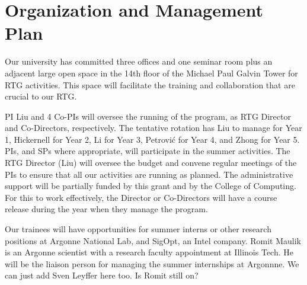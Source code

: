 \documentclass[11pt]{NSFamsart}
\begin{document}
\section{Organization and Management Plan }
 
 \iffalse
 Provide evidence of past success in training undergraduates, graduate students, and postdocs, identifying names, degree dates, and subsequent placement (including the flow of undergraduates into graduate programs). Applicants may refer to Trainee Data in supplemental documents, if included. Describe the plans, procedures, and personnel for the development and monitoring of all aspects of the project. In particular, discuss plans to ensure appropriate mentoring of students and postdoctoral associates, as well as the roles of the faculty involved. Provide evidence of faculty commitment necessary for the implementation of the proposed program. If the project involves international collaborations, industrial internships, or arrangements with government laboratories, businesses, or other departments, then the proposal should document existing arrangements, any plans for expanding these arrangements, and the personnel involved in managing these linkages.  
 \fi
 
Our university has committed three offices and one seminar room plus an adjacent large open space in the 14th floor of the Michael Paul Galvin Tower for RTG activities. This space will facilitate the training and collaboration that are crucial to our RTG.
 
PI Liu and 4 Co-PIs will oversee the running of the program, as RTG Director  and Co-Directors, respectively.  The tentative rotation has Liu to manage for Year 1, Hickernell for Year 2,    Li for  Year 3, Petrovi\'{c} for Year 4,     and Zhong for Year 5.    PIs, and SPs where appropriate, will participate in the summer activities.
The RTG Director (Liu) will oversee the budget and convene regular meetings of the PIs to ensure that all our activities are running as planned. %
The administrative support will be partially funded by this grant and by the College of Computing. 
For this to work effectively, the Director or Co-Directors will have a course release during the year when they manage the program.


Our trainees will have opportunities for summer interns or other research positions at Argonne National Lab, and SigOpt, an Intel company. Romit Maulik  is an Argonne scientist with a research faculty appointment at Illinois Tech.  He will be the liaison person for managing the summer internships at Argonnne. {\color{red}We can just add Sven Leyffer here too. Is Romit still on?} 
\end{document}
